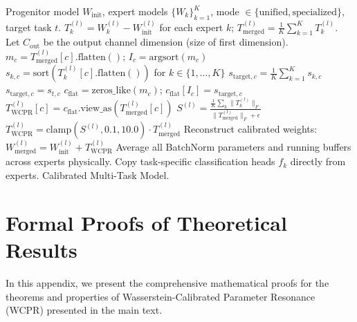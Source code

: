 \documentclass{article}
\theoremstyle{plain}
\theoremstyle{definition}
\theoremstyle{remark}
\begin{document}
\begin{algorithm}[H]
  \caption{Channel-Wise Wasserstein-Calibrated Parameter Resonance}
  \label{alg:wcpr}
  \begin{algorithmic}[1]
  \footnotesize
     Progenitor model $W_{\text{init}}$, expert models $\{W_k\}_{k=1}^K$, mode $\in \{\text{unified}, \text{specialized}\}$, target task $t$.
    \STATE $T^{(l)}_k = W^{(l)}_k - W^{(l)}_{\text{init}}$ for each expert $k$; $T^{(l)}_{\text{merged}} = \frac{1}{K} \sum_{k=1}^K T^{(l)}_k$.
        \STATE Let $C_{\text{out}}$ be the output channel dimension (size of first dimension).
          \STATE $m_c = T^{(l)}_{\text{merged}}[c].\text{flatten}()$; $I_c = \text{argsort}(m_c)$
          \STATE $s_{k, c} = \text{sort}(T^{(l)}_k[c].\text{flatten}())$ for $k \in \{1, \dots, K\}$
            \STATE $s_{\text{target}, c} = \frac{1}{K} \sum_{k=1}^K s_{k, c}$
          \ELSE
            \STATE $s_{\text{target}, c} = s_{t, c}$
          \ENDIF
          \STATE $c_{\text{flat}} = \text{zeros\_like}(m_c)$; $c_{\text{flat}}[I_c] = s_{\text{target}, c}$
          \STATE $T^{(l)}_{\text{WCPR}}[c] = c_{\text{flat}}.\text{view\_as}(T^{(l)}_{\text{merged}}[c])$
        \ENDFOR
      \ELSE
        \STATE $S^{(l)} = \frac{\frac{1}{K}\sum_k \|T^{(l)}_k\|_F}{\|T^{(l)}_{\text{merged}}\|_F + \epsilon}$
        \STATE $T^{(l)}_{\text{WCPR}} = \text{clamp}(S^{(l)}, 0.1, 10.0) \cdot T^{(l)}_{\text{merged}}$
      \ENDIF
      \STATE Reconstruct calibrated weights: $W^{(l)}_{\text{merged}} = W^{(l)}_{\text{init}} + T^{(l)}_{\text{WCPR}}$
    \ENDFOR
    \STATE Average all BatchNorm parameters and running buffers across experts physically.
    \STATE Copy task-specific classification heads $f_k$ directly from experts.
     Calibrated Multi-Task Model.
  \end{algorithmic}
\end{algorithm}

\section{Formal Proofs of Theoretical Results}
\label{app:proofs}

In this appendix, we present the comprehensive mathematical proofs for the theorems and properties of Wasserstein-Calibrated Parameter Resonance (WCPR) presented in the main text.
\end{document}
